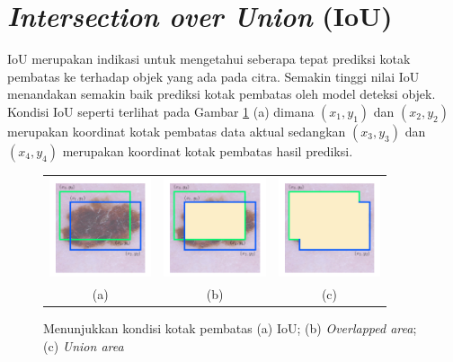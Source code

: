 \section{\textit{Intersection over Union} (IoU)}
IoU merupakan indikasi untuk mengetahui seberapa tepat prediksi kotak pembatas ke terhadap objek yang ada pada citra. Semakin tinggi nilai IoU menandakan semakin baik prediksi kotak pembatas oleh model deteksi objek. Kondisi IoU seperti terlihat pada Gambar \ref{fig:iou-cond} (a) dimana $(x_1, y_1)$ dan $(x_2, y_2)$ merupakan koordinat kotak pembatas data aktual sedangkan $(x_3, y_3)$ dan $(x_4, y_4)$ merupakan koordinat kotak pembatas hasil prediksi.

\begin{figure}[H]
    \centering
    \begin{tabular}{ccc}
        \includegraphics[width=3cm]{../img/IoU Original - Latex.png}
        &
        \includegraphics[width=3cm]{../img/IoU Overlapped - Latex.png}
        &
        \includegraphics[width=3cm]{../img/IoU Union - Latex.png}\\
        (a) &(b) &(c)\\
    \end{tabular}
    \caption{Menunjukkan kondisi kotak pembatas (a) IoU; (b) \textit{Overlapped area}; (c) \textit{Union area}}
    \label{fig:iou-cond}
\end{figure}

